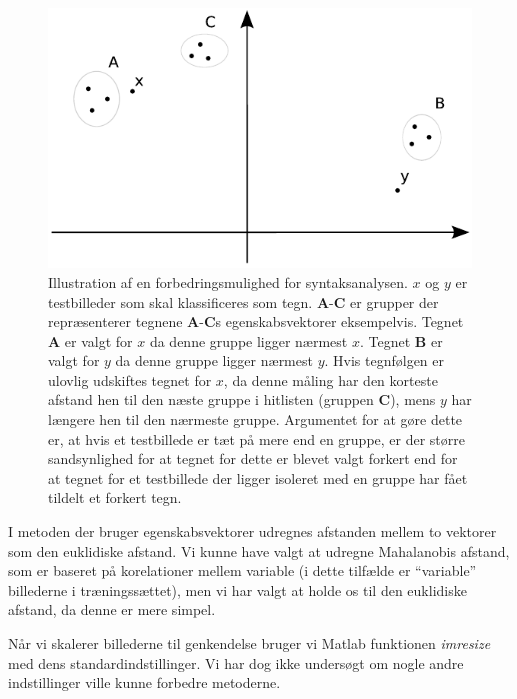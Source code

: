 \begin{figure}[htp]
\centering
\includegraphics{implementation/illu/syntaks_forbedring.pdf}
\caption{Illustration af en forbedringsmulighed for syntaksanalysen. $x$ og $y$ er testbilleder som skal klassificeres som tegn. \textbf{A}-\textbf{C} er grupper der repræsenterer tegnene \textbf{A}-\textbf{C}s egenskabsvektorer eksempelvis. Tegnet \textbf{A} er valgt for $x$ da denne gruppe ligger nærmest $x$. Tegnet \textbf{B} er valgt for $y$ da denne gruppe ligger nærmest $y$. Hvis tegnfølgen er ulovlig udskiftes tegnet for $x$, da denne måling har den korteste afstand hen til den næste gruppe i hitlisten (gruppen \textbf{C}), mens $y$ har længere hen til den nærmeste gruppe. Argumentet for at gøre dette er, at hvis et testbillede er tæt på mere end en gruppe, er der større sandsynlighed for at tegnet for dette er blevet valgt forkert end for at tegnet for et testbillede der ligger isoleret med en gruppe har fået tildelt et forkert tegn.}
\label{fig:syntaks_forbedring}
\end{figure}

I metoden der bruger egenskabsvektorer udregnes afstanden mellem to vektorer som den euklidiske afstand. Vi kunne have valgt at udregne Mahalanobis afstand, som er baseret på korelationer mellem variable (i dette tilfælde er ``variable'' billederne i træningssættet), men vi har valgt at holde os til den euklidiske afstand, da denne er mere simpel.

Når vi skalerer billederne til genkendelse bruger vi Matlab funktionen \textit{imresize} med dens standardindstillinger. Vi har dog ikke undersøgt om nogle andre indstillinger ville kunne forbedre metoderne.